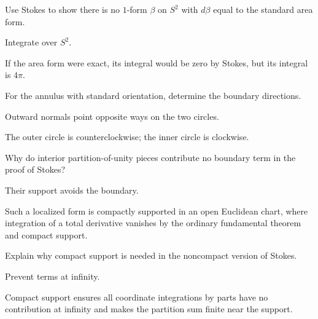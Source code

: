\begin{exercise}\label{exr:vii11-19}
Use Stokes to show there is no $1$-form $\beta$ on $S^2$ with $d\beta$ equal to the standard area form.
\end{exercise}
\begin{hint}
Integrate over $S^2$.
\end{hint}
\begin{solution}
If the area form were exact, its integral would be zero by Stokes, but its integral is $4\pi$.
\end{solution}

\begin{exercise}\label{exr:vii11-20}
For the annulus with standard orientation, determine the boundary directions.
\end{exercise}
\begin{hint}
Outward normals point opposite ways on the two circles.
\end{hint}
\begin{solution}
The outer circle is counterclockwise; the inner circle is clockwise.
\end{solution}

\begin{exercise}\label{exr:vii11-21}
Why do interior partition-of-unity pieces contribute no boundary term in the proof of Stokes?
\end{exercise}
\begin{hint}
Their support avoids the boundary.
\end{hint}
\begin{solution}
Such a localized form is compactly supported in an open Euclidean chart, where integration of a total derivative vanishes by the ordinary fundamental theorem and compact support.
\end{solution}

\begin{exercise}\label{exr:vii11-22}
Explain why compact support is needed in the noncompact version of Stokes.
\end{exercise}
\begin{hint}
Prevent terms at infinity.
\end{hint}
\begin{solution}
Compact support ensures all coordinate integrations by parts have no contribution at infinity and makes the partition sum finite near the support.
\end{solution}

